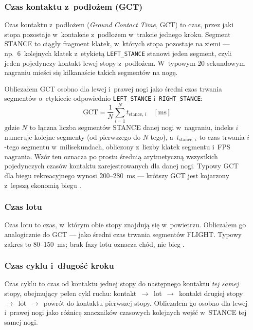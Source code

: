 \subsubsection{Czas kontaktu z~podłożem (GCT)}

Czas kontaktu z~podłożem (\textit{Ground Contact Time}, GCT) to czas, przez jaki stopa pozostaje w~kontakcie z~podłożem w~trakcie jednego kroku. Segment STANCE to ciągły fragment klatek, w~których stopa pozostaje na ziemi --- np.~6~kolejnych klatek z~etykietą \texttt{LEFT\_STANCE} stanowi jeden segment, czyli jeden pojedynczy kontakt lewej stopy z~podłożem. W~typowym 20-sekundowym nagraniu mieści się kilkanaście takich segmentów na nogę.

Obliczałem GCT osobno dla lewej i~prawej nogi jako średni czas trwania segmentów o~etykiecie odpowiednio \texttt{LEFT\_STANCE} i~\texttt{RIGHT\_STANCE}:
\[
\text{GCT} = \frac{1}{N} \sum_{i=1}^{N} t_{\text{stance},\,i} \quad [\text{ms}]
\]
gdzie $N$ to łączna liczba segmentów STANCE danej nogi w~nagraniu, indeks $i$ numeruje kolejne segmenty (od pierwszego do $N$-tego), a~$t_{\text{stance},\,i}$ to czas trwania $i$-tego segmentu w~milisekundach, obliczony z~liczby klatek segmentu i~FPS nagrania. Wzór ten oznacza po prostu średnią arytmetyczną wszystkich pojedynczych czasów kontaktu zarejestrowanych dla danej nogi. Typowy GCT dla biegu rekreacyjnego wynosi 200--280~ms --- krótszy GCT jest kojarzony z~lepszą ekonomią biegu \cite{souza2016}.

\subsubsection{Czas lotu}

Czas lotu  to czas, w~którym obie stopy znajdują się w~powietrzu. Obliczałem go analogicznie do GCT --- jako średni czas trwania segmentów FLIGHT. Typowy zakres to 80--150~ms; brak fazy lotu oznacza chód, nie bieg \cite{novacheck1998}.

\subsubsection{Czas cyklu i~długość kroku}

Czas cyklu to czas od kontaktu jednej stopy do następnego kontaktu \textit{tej samej} stopy, obejmujący pełen cykl ruchu: kontakt~$\to$~lot~$\to$~kontakt drugiej stopy~$\to$~lot~$\to$~powrót do kontaktu pierwszej stopy. Obliczałem go osobno dla lewej i~prawej nogi jako różnicę znaczników czasowych kolejnych wejść w~STANCE tej samej nogi.

